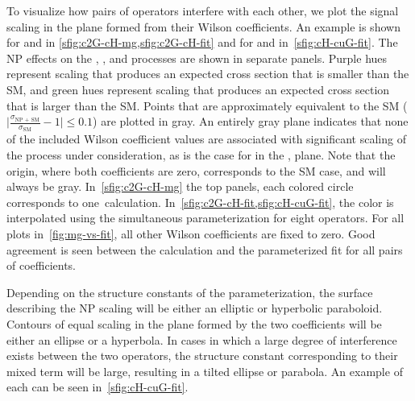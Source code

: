 To visualize how pairs of operators interfere with each other, we plot the
signal scaling in the plane formed from their Wilson coefficients. An example is
shown for \cH and \ctwoG in \cref{sfig:c2G-cH-mg,sfig:c2G-cH-fit} and for \cH
and \cuG in~\cref{sfig:cH-cuG-fit}. The NP effects on the \ttZ, \ttH, and \ttW
processes are shown in separate panels. Purple hues represent scaling that
produces an expected cross section that is smaller than the SM, and green hues
represent scaling that produces an expected cross section that is larger than
the SM. Points that are approximately equivalent to the SM
($\lvert\frac{\sigma_\text{NP + SM}}{\sigma_\text{SM}} - 1 \rvert \le 0.1$) are
plotted in gray. An entirely gray plane indicates that none of the included
Wilson coefficient values are associated with significant scaling of the process
under consideration, as is the case for \ttW in the \cuG, \ctwoG plane. Note
that the origin, where both coefficients are zero, corresponds to the SM case,
and will always be gray. In~\cref{sfig:c2G-cH-mg} the top panels, each colored
circle corresponds to one~\madgraph calculation.
In~\cref{sfig:c2G-cH-fit,sfig:cH-cuG-fit}, the color is interpolated using the
simultaneous parameterization for eight operators. For all plots
in~\cref{fig:mg-vs-fit}, all other Wilson coefficients are fixed to zero. Good
agreement is seen between the \madgraph calculation and the parameterized fit
for all pairs of coefficients.

Depending on the structure constants of the parameterization, the surface
describing the NP scaling will be either an elliptic or hyperbolic paraboloid.
Contours of equal scaling in the plane formed by the two coefficients will be
either an ellipse or a hyperbola. In cases in which a large degree of
interference exists between the two operators, the structure constant
corresponding to their mixed term will be large, resulting in a tilted ellipse
or parabola. An example of each can be seen in~\cref{sfig:cH-cuG-fit}.

